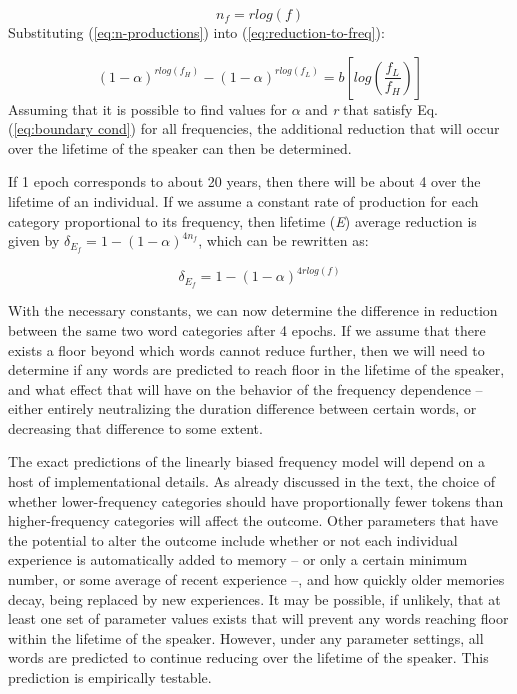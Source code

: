 \begin{equation}
n_{f}=rlog(f)\label{eq:n-productions}
\end{equation}
Substituting (\ref{eq:n-productions}) into (\ref{eq:reduction-to-freq}):

\begin{equation}
(1-\alpha)^{rlog(f_{H})}-(1-\alpha)^{rlog(f_{L})}=b[log(\frac{f_{L}}{f_{H}})]\label{eq:boundary cond}
\end{equation}
Assuming that it is possible to find values for $\alpha$ and \emph{r}
that satisfy Eq. (\ref{eq:boundary cond}) for all frequencies, the
additional reduction that will occur over the lifetime of the speaker
can then be determined. 

If 1 epoch corresponds to about 20 years, then there will be about
4 over the lifetime of an individual. If we assume a constant rate
of production for each category proportional to its frequency, then
lifetime (\emph{E}) average reduction is given by $\delta_{E_{f}}=1-(1-\alpha)^{4n_{f}}$,
which can be rewritten as:

\begin{equation}
\delta_{E_{f}}=1-(1-\alpha)^{4rlog(f)}
\end{equation}

With the necessary constants, we can now determine the difference
in reduction between the same two word categories after 4 epochs.
If we assume that there exists a floor beyond which words cannot reduce
further, then we will need to determine if any words are predicted
to reach floor in the lifetime of the speaker, and what effect that
will have on the behavior of the frequency dependence – either entirely
neutralizing the duration difference between certain words, or decreasing
that difference to some extent. 

The exact predictions of the linearly biased frequency model will
depend on a host of implementational details. As already discussed
in the text, the choice of whether lower-frequency categories should
have proportionally fewer tokens than higher-frequency categories
will affect the outcome. Other parameters that have the potential
to alter the outcome include whether or not each individual experience
is automatically added to memory – or only a certain minimum number,
or some average of recent experience –, and how quickly older memories
decay, being replaced by new experiences. It may be possible, if unlikely,
that at least one set of parameter values exists that will prevent
any words reaching floor within the lifetime of the speaker. However,
under any parameter settings, all words are predicted to continue
reducing over the lifetime of the speaker. This prediction is empirically
testable.

